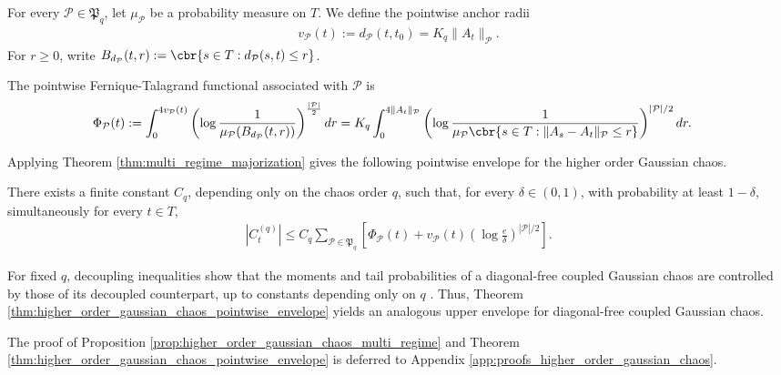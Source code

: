 \documentclass[11pt]{article}
\begin{document}
For every
$\mathcal P\in\mathfrak P_q$, let $\mu_{\mathcal P}$ be a probability measure
on $T$. We define the pointwise anchor radii
\begin{align}
v_{\mathcal P}(t)
:=
d_{\mathcal P}(t,t_0)
=
K_q\|A_t\|_{\mathcal P}.
\label{eq:gaussian_chaos_anchor_radii}
\end{align}
For $r\ge0$, write $B_{d_{\mathcal P}}(t,r)
:=
\cbr{s\in T:d_{\mathcal P}(s,t)\le r}$.

The pointwise Fernique-Talagrand functional associated with
$\mathcal P$ is
\begin{align}
\Phi_{\mathcal P}(t)
&:=
\int_0^{4v_{\mathcal P}(t)}
\left(
\log\frac{1}{
\mu_{\mathcal P}(B_{d_{\mathcal P}}(t,r))
}
\right)^{\frac{|\mathcal P|}{2}}dr
=
K_q
\int_0^{4\|A_t\|_{\mathcal P}}
\left(
\log\frac{1}{
\mu_{\mathcal P}
\cbr{
s\in T:
\|A_s-A_t\|_{\mathcal P}\le r
}
}
\right)^{|\mathcal P|/2}dr.
\label{eq:gaussian_chaos_pointwise_functionals}
\end{align}

Applying Theorem \ref{thm:multi_regime_majorization} gives the
following pointwise envelope for the higher order Gaussian chaos.

\begin{theorem}
\label{thm:higher_order_gaussian_chaos_pointwise_envelope}
There exists a finite constant $C_q$, depending only on the chaos order
$q$, such that, for every $\delta\in(0,1)$, with probability at least
$1-\delta$, simultaneously for every $t\in T$,
\begin{align}
\left|C_t^{(q)}\right|
\le
C_q
\sum_{\mathcal P\in\mathfrak P_q}
\left[
\Phi_{\mathcal P}(t)
+
v_{\mathcal P}(t)
\left(
\log\frac{e}{\delta}
\right)^{|\mathcal P|/2}
\right].
\label{eq:higher_order_gaussian_chaos_pointwise_envelope}
\end{align}
\end{theorem}
For fixed $q$, decoupling inequalities show that the moments and tail probabilities of a diagonal-free coupled Gaussian chaos are controlled by those of its decoupled counterpart, up to constants depending only on $q$ \citep{delapena1994contraction}. Thus,
Theorem \ref{thm:higher_order_gaussian_chaos_pointwise_envelope} yields
an analogous upper envelope for diagonal-free coupled Gaussian chaos.

The proof of Proposition
\ref{prop:higher_order_gaussian_chaos_multi_regime} and Theorem
\ref{thm:higher_order_gaussian_chaos_pointwise_envelope} is deferred to
Appendix \ref{app:proofs_higher_order_gaussian_chaos}.
\end{document}
